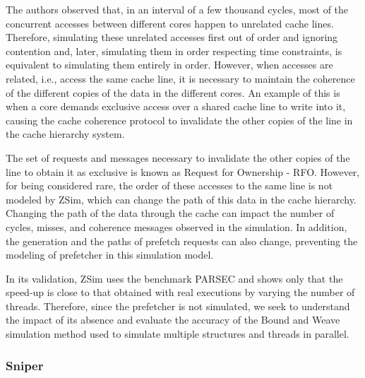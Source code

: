 \documentclass[AMA,final,STIX1COL]{WileyNJD-v2}
\begin{document}
The authors observed that, in an interval of a few thousand cycles, most of the concurrent accesses between different cores happen to unrelated cache lines.
Therefore, simulating these unrelated accesses first out of order and ignoring contention and, later, simulating them in order respecting time constraints, is equivalent to simulating them entirely in order.
However, when accesses are related, i.e., access the same cache line, it is necessary to maintain the coherence of the different copies of the data in the different cores.
An example of this is when a core demands exclusive access over a shared cache line to write into it, causing the cache coherence protocol to invalidate the other copies of the line in the cache hierarchy system.

The set of requests and messages necessary to invalidate the other copies of the line to obtain it as exclusive is known as Request for Ownership - RFO.
However, for being considered rare, the order of these accesses to the same line is not modeled by ZSim, which can change the path of this data in the cache hierarchy.
Changing the path of the data through the cache can impact the number of cycles, misses, and coherence messages observed in the simulation.
In addition, the generation and the paths of prefetch requests can also change, preventing the modeling of prefetcher in this simulation model.

In its validation, ZSim uses the benchmark PARSEC \cite{bienia2008parsec} and shows only that the speed-up is close to that obtained with real executions by varying the number of threads.
Therefore, since the prefetcher is not simulated, we seek to understand the impact of its absence and evaluate the accuracy of the Bound and Weave simulation method used to simulate multiple structures and threads in parallel. 

\subsubsection{Sniper}
\label{subsubsec:sniper}
\end{document}
